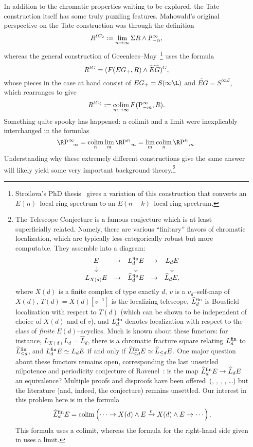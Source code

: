 In addition to the chromatic properties waiting to be explored, the Tate construction itself has some truly puzzling features.  Mahowald's original perspective on the Tate construction was through the definition \[R^{tC_2} := \lim_{n \to \infty} \Sigma R \wedge \mathrm P^\infty_{-n},\] whereas the general construction of Greenlees--May~\cite{GreenleesMay}\footnote{Stroilova's PhD thesis~\cite{Stroilova} gives a variation of this construction that converts an \(E(n)\)--local ring spectrum to an \(E(n-k)\)--local ring spectrum.} uses the formula \[R^{tG} = (F(EG_+, R) \wedge \widetilde{EG})^G,\] whose pieces in the case at hand consist of \(EG_+ = S(\infty \L)\) and \(\widetilde{EG} = S^{\infty \mathcal L}\), which rearranges to give \[R^{tC_2} := \operatorname*{colim}_{m \to \infty} F(\mathrm P^\infty_{-m}, R).\]  Something quite spooky has happened: a colimit and a limit were inexplicably interchanged in the formulas \[\RP^\infty_{-\infty} = \colim_n \lim_m \RP^n_{-m} = \lim_m \colim_n \RP^n_{-m}.\]  Understanding why these extremely different constructions give the same answer will likely yield some very important background theory.\footnote{The Telescope Conjecture is a famous conjecture which is at least superficially related.  Namely, there are various ``finitary'' flavors of chromatic localization, which are typically less categorically robust but more computable.  They assemble into a diagram:
\[\begin{array}{ccccc}
E & \to & L_d^{\mathrm{fin}} E & \to & L_d E \\
\downarrow & & \downarrow & & \downarrow \\
L_{X(d)} E & \to & \widehat L_d^{\mathrm{fin}} E & \to & \widehat L_d E,
\end{array}\]
where \(X(d)\) is a finite complex of type exactly \(d\), \(v\) is a \(v_d\)--self-map of \(X(d)\), \(T(d) = X(d)[v^{-1}]\) is the localizing telescope, \(\widehat L_d^{\mathrm{fin}}\) is Bousfield localization with respect to \(T(d)\) (which can be shown to be independent of choice of \(X(d)\) and of \(v\)), and \(L_d^{\mathrm{fin}}\) denotes localization with respect to the class of \emph{finite} \(E(d)\)--acyclics.  Much is known about these functors: for instance, \(L_{X(d)} L_d = \widehat L_d\), there is a chromatic fracture square relating \(L_d^{\mathrm{fin}}\) to \(\widehat L_{\le d}^{\mathrm{fin}}\), and \(L_d^{\mathrm{fin}} E \simeq L_d E\) if and only if \(\widehat L_{\le d}^{\mathrm{fin}} E \simeq \widehat L_{\le d} E\).  One major question about these functors remains open, corresponding the last unsettled nilpotence and periodicity conjecture of Ravenel~\cite[Conjecture 10.5]{RavenelLocalizationWRTPeriodic}: is the map \(\widehat L_d^{\mathrm{fin}} E \to \widehat L_d E\) an equivalence?  Multiple proofs and disproofs have been offered~(\cite{RavenelObit}, \cite{MahowaldSadofsky}, \cite{Krause}, \cite{MRS}, \ldots) but the literature (and, indeed, the conjecture) remains unsettled.  Our interest in this problem here is in the formula \[\widehat L_d^{\mathrm{fin}} E = \operatorname*{colim}\left(\cdots \to X(d) \wedge E \xrightarrow{v} X(d) \wedge E \to \cdots\right).\]  This formula uses a colimit, whereas the formula for the right-hand side given in  uses a limit.}

